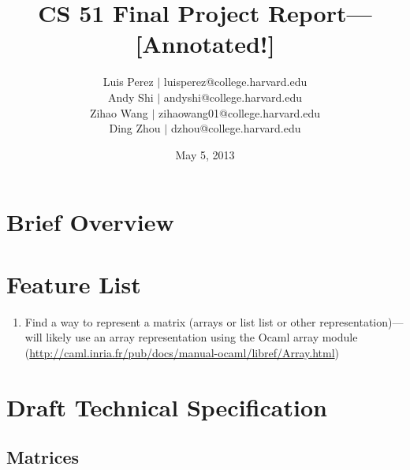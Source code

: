 \documentclass[letterpaper,11pt]{article}
\newcommand{\annot}[1]{\textbf{\color{BrickRed} [#1]}}
\begin{document}
\title{CS 51 Final Project Report---\annot{Annotated!}}
\author{
Luis Perez $|$ luisperez@college.harvard.edu \\ 
Andy Shi $|$ andyshi@college.harvard.edu \\ 
Zihao Wang $|$ zihaowang01@college.harvard.edu \\ 
Ding Zhou $|$ dzhou@college.harvard.edu
}
\date{May 5, 2013}
\maketitle

\section{Brief Overview}

\section{Feature List}
\begin{enumerate}

\item Find a way to represent a matrix (arrays or list list or other
representation)---will likely use an array representation using the Ocaml array
module (\url{http://caml.inria.fr/pub/docs/manual-ocaml/libref/Array.html})

\end{enumerate}

\section{Draft Technical Specification}

\subsection{Matrices}
\end{document}
